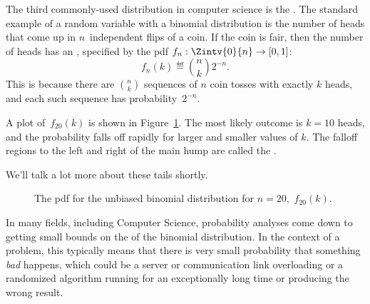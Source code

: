 The third commonly-used distribution in computer science is the
.  The standard example of a random
variable with a binomial distribution is the number of heads that come
up in $n$~independent flips of a coin.  If the coin is fair, then the
number of heads has an ,
specified by the pdf $f_n: \Zintv{0}{n} \to [0, 1]$:
\[
f_n(k) \eqdef \binom{n}{k}2^{-n}.
\]
This is because there are $\binom{n}{k}$ sequences of $n$ coin tosses
with exactly $k$ heads, and each such sequence has probability~$2^{-n}$.

A plot of~$f_{20}(k)$ is shown in Figure~\ref{fig:16F5}.  The most
likely outcome is $k = 10$ heads, and the probability falls off
rapidly for larger and smaller values of $k$.  The falloff regions to
the left and right of the main hump are called the .

\begin{editingnotes}
We'll talk a lot more about these tails shortly.
\end{editingnotes}

\begin{figure}


\caption{The pdf for the unbiased binomial distribution for $n =
  20$,~$f_{20}(k)$.}

\label{fig:16F5}

\end{figure}

\iffalse
The cumulative distribution function for the unbiased binomial
distribution is $F_n: \reals \to [0, 1]$ where
\begin{equation*}
F_n(x) =
    \begin{cases}
        0 & \text{if $x < 1$} \\
        \sum_{i = 0}^k \binom{n}{i} 2^{-n}
            & \text{if $k \le x < k + 1$ for $1 \le k < n$} \\
        1 & \text{if $n \le x$}.
    \end{cases}
\end{equation*}
\fi

In many fields, including Computer Science, probability analyses come down
to getting small bounds on the  of the binomial distribution.
In the context of a problem, this typically means that there is very small
probability that something \emph{bad} happens, which could be a server
or communication link overloading or a randomized algorithm running for an
exceptionally long time or producing the wrong result.


